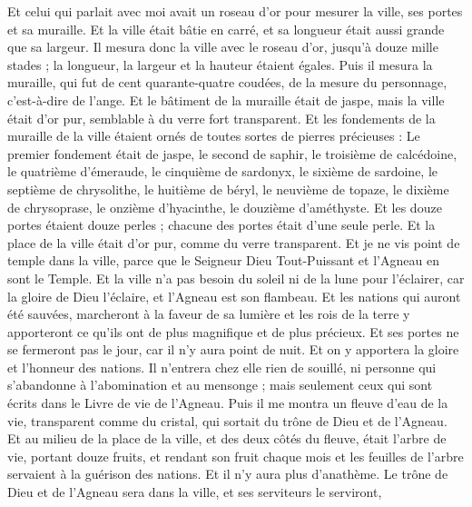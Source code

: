 \begin{multicols}{2}
Et celui qui parlait avec moi avait un roseau d'or pour mesurer la ville, ses portes et sa muraille.
Et la ville était bâtie en carré, et sa longueur était aussi grande que sa largeur. Il mesura donc la ville avec le roseau d'or, jusqu'à douze mille stades ; la longueur, la largeur et la hauteur étaient égales.
Puis il mesura la muraille, qui fut de cent quarante-quatre coudées, de la mesure du personnage, c'est-à-dire de l'ange.
Et le bâtiment de la muraille était de jaspe, mais la ville était d'or pur, semblable à du verre fort transparent.
Et les fondements de la muraille de la ville étaient ornés de toutes sortes de pierres précieuses : Le premier fondement était de jaspe, le second de saphir, le troisième de calcédoine, le quatrième d'émeraude,
le cinquième de sardonyx, le sixième de sardoine, le septième de chrysolithe, le huitième de béryl, le neuvième de topaze, le dixième de chrysoprase, le onzième d'hyacinthe, le douzième d'améthyste.
Et les douze portes étaient douze perles ; chacune des portes était d'une seule perle. Et la place de la ville était d'or pur, comme du verre transparent.
Et je ne vis point de temple dans la ville, parce que le Seigneur Dieu Tout-Puissant et l'Agneau en sont le Temple.
Et la ville n'a pas besoin du soleil ni de la lune pour l'éclairer, car la gloire de Dieu l'éclaire, et l'Agneau est son flambeau.
Et les nations qui auront été sauvées, marcheront à la faveur de sa lumière et les rois de la terre y apporteront ce qu'ils ont de plus magnifique et de plus précieux.
Et ses portes ne se fermeront pas le jour, car il n'y aura point de nuit.
Et on y apportera la gloire et l'honneur des nations.
Il n'entrera chez elle rien de souillé, ni personne qui s'abandonne à l'abomination et au mensonge ; mais seulement ceux qui sont écrits dans le Livre de vie de l'Agneau.
\VerseOne{}Puis il me montra un fleuve d'eau de la vie, transparent comme du cristal, qui sortait du trône de Dieu et de l'Agneau.
Et au milieu de la place de la ville, et des deux côtés du fleuve, était l'arbre de vie, portant douze fruits, et rendant son fruit chaque mois et les feuilles de l'arbre servaient à la guérison des nations.
Et il n'y aura plus d'anathème. Le trône de Dieu et de l'Agneau sera dans la ville, et ses serviteurs le serviront,

\end{multicols}
